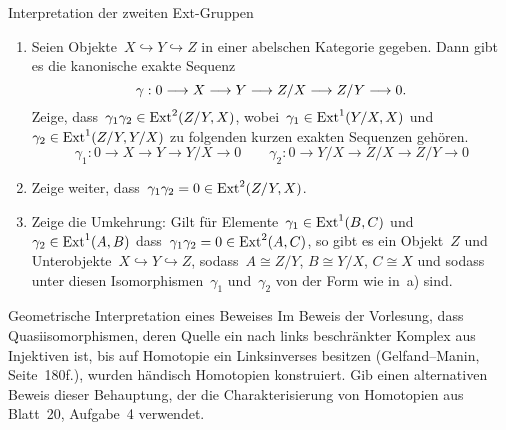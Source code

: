 \documentclass{uebblatt}
\begin{document}
\begin{aufgabe}{Interpretation der zweiten Ext-Gruppen}
\begin{enumerate}
\item Seien Objekte~$X \hookrightarrow Y \hookrightarrow Z$ in einer abelschen
Kategorie gegeben. Dann gibt es die kanonische exakte Sequenz
\[ \gamma : 0 \longrightarrow X \longrightarrow Y \longrightarrow Z/X \longrightarrow Z/Y \longrightarrow 0. \]
Zeige, dass~$\gamma_1 \gamma_2 \in \mathrm{Ext}^2(Z/Y,X)$, wobei~$\gamma_1 \in
\mathrm{Ext}^1(Y/X,X)$ und $\gamma_2 \in \mathrm{Ext}^1(Z/Y,Y/X)$ zu folgenden kurzen exakten
Sequenzen gehören.
\[ \gamma_1 : 0 \to X \to Y \to Y/X \to 0 \qquad
  \gamma_2 : 0 \to Y/X \to Z/X \to Z/Y \to 0 \]
\item Zeige weiter, dass~$\gamma_1 \gamma_2 = 0 \in \mathrm{Ext}^2(Z/Y,X)$.
\item Zeige die Umkehrung: Gilt für Elemente~$\gamma_1 \in \mathrm{Ext}^1(B,C)$ und
$\gamma_2 \in \mathrm{Ext}^1(A,B)$ dass~$\gamma_1 \gamma_2 = 0 \in \mathrm{Ext}^2(A,C)$, so
gibt es ein Objekt~$Z$ und Unterobjekte~$X \hookrightarrow Y \hookrightarrow
Z$, sodass~$A \cong Z/Y$, $B \cong Y/X$, $C \cong X$ und sodass unter diesen
Isomorphismen~$\gamma_1$ und~$\gamma_2$ von der Form wie in~a) sind.
\end{enumerate}
\end{aufgabe}

\newpage

\begin{aufgabe}{Geometrische Interpretation eines Beweises}
Im Beweis der Vorlesung, dass Quasiisomorphismen, deren Quelle ein nach links
beschränkter Komplex aus Injektiven ist, bis auf Homotopie ein Linksinverses
besitzen (Gelfand--Manin, Seite~180f.), wurden händisch Homotopien konstruiert.
Gib einen alternativen Beweis dieser Behauptung, der die
Charakterisierung von Homotopien aus Blatt~20, Aufgabe~4 verwendet.
\end{aufgabe}
\end{document}
